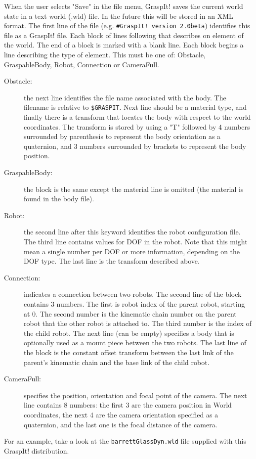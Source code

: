 When the user selects "Save" in the file menu, GraspIt! saves the
current world state in a text world (.wld) file. In the future this
will be stored in an XML format. The first line of the file
(e.g. \texttt{\#GraspIt! version 2.0beta}) identifies this file as a
GraspIt!  file. Each block of lines following that describes on
element of the world. The end of a block is marked with a blank
line. Each block begins a line describing the type of element. This
must be one of: Obstacle, GraspableBody, Robot, Connection or
CameraFull.
\begin{description}
\item[Obstacle:] the next line identifies the file name associated
  with the body. The filename is relative to \texttt{\$GRASPIT}. Next
  line should be a material type, and finally there is a transform
  that locates the body with respect to the world coordinates. The
  transform is stored by using a "T" followed by 4 numbers surrounded
  by parenthesis to represent the body orientation as a quaternion,
  and 3 numbers surrounded by brackets to represent the body position.
\item[GraspableBody:] the block is the same except the material line
  is omitted (the material is found in the body file).
\item[Robot:] the second line after this keyword identifies the robot
  configuration file. The third line contains values for DOF in the
  robot. Note that this might mean a single number per DOF or more
  information, depending on the DOF type. The last line is the
  transform described above.
\item[Connection:] indicates a connection between two robots. The
  second line of the block contains 3 numbers. The first is robot
  index of the parent robot, starting at 0. The second number is the
  kinematic chain number on the parent robot that the other robot is
  attached to. The third number is the index of the child robot. The
  next line (can be empty) specifies a body that is optionally used as
  a mount piece between the two robots. The last line of the block is
  the constant offset transform between the last link of the parent's
  kinematic chain and the base link of the child robot.
\item[CameraFull:] specifies the position, orientation and focal point
  of the camera. The next line contains 8 numbers: the first 3 are the
  camera position in World coordinates, the next 4 are the camera
  orientation specified as a quaternion, and the last one is the focal
  distance of the camera.
\end{description}

For an example, take a look at the \texttt{barrettGlassDyn.wld} file
supplied with this GraspIt! distribution.

